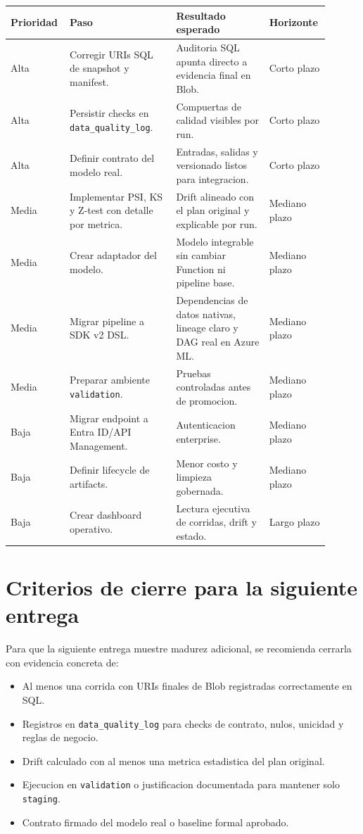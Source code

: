\documentclass[11pt,letterpaper]{article}
\newcommand{\code}[1]{\texttt{\small #1}}
\begin{document}
\begin{longtable}{p{0.16\linewidth}p{0.32\linewidth}p{0.28\linewidth}p{0.14\linewidth}}
\toprule
\textbf{Prioridad} & \textbf{Paso} & \textbf{Resultado esperado} & \textbf{Horizonte}\\
\midrule
\endhead
Alta & Corregir URIs SQL de snapshot y manifest. & Auditoria SQL apunta directo a evidencia final en Blob. & Corto plazo\\
Alta & Persistir checks en \code{data\_quality\_log}. & Compuertas de calidad visibles por run. & Corto plazo\\
Alta & Definir contrato del modelo real. & Entradas, salidas y versionado listos para integracion. & Corto plazo\\
Media & Implementar PSI, KS y Z-test con detalle por metrica. & Drift alineado con el plan original y explicable por run. & Mediano plazo\\
Media & Crear adaptador del modelo. & Modelo integrable sin cambiar Function ni pipeline base. & Mediano plazo\\
Media & Migrar pipeline a SDK v2 DSL. & Dependencias de datos nativas, lineage claro y DAG real en Azure ML. & Mediano plazo\\
Media & Preparar ambiente \code{validation}. & Pruebas controladas antes de promocion. & Mediano plazo\\
Baja & Migrar endpoint a Entra ID/API Management. & Autenticacion enterprise. & Mediano plazo\\
Baja & Definir lifecycle de artifacts. & Menor costo y limpieza gobernada. & Mediano plazo\\
Baja & Crear dashboard operativo. & Lectura ejecutiva de corridas, drift y estado. & Largo plazo\\
\bottomrule
\end{longtable}

\section*{Criterios de cierre para la siguiente entrega}

Para que la siguiente entrega muestre madurez adicional, se recomienda cerrarla con evidencia concreta de:

\begin{itemize}[leftmargin=*]
  \item Al menos una corrida con URIs finales de Blob registradas correctamente en SQL.
  \item Registros en \code{data\_quality\_log} para checks de contrato, nulos, unicidad y reglas de negocio.
  \item Drift calculado con al menos una metrica estadistica del plan original.
  \item Ejecucion en \code{validation} o justificacion documentada para mantener solo \code{staging}.
  \item Contrato firmado del modelo real o baseline formal aprobado.
\end{itemize}
\end{document}
